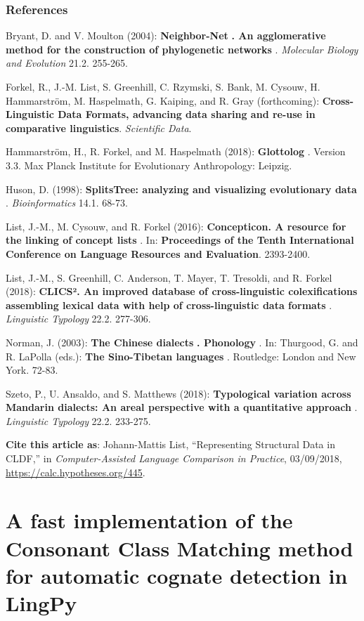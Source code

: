 \documentclass[
  english,
  a4paper,
  oneside,tablecaptionabove
]{scrbook}
\begin{document}
\hypertarget{references}{\subsection*{References}\label{references}}

Bryant, D. and V. Moulton (2004): \textbf{Neighbor-Net} \textbf{. An
agglomerative method for the construction of phylogenetic networks} .
\emph{Molecular Biology and Evolution} 21.2. 255-265.

Forkel, R., J.-M. List, S. Greenhill, C. Rzymski, S. Bank, M.
Cysouw, H. Hammarström, M. Haspelmath, G. Kaiping, and R. Gray
(forthcoming): \textbf{Cross-Linguistic Data Formats, advancing data
sharing and re-use in comparative linguistics}. \emph{Scientific Data}.

Hammarström, H., R. Forkel, and M. Haspelmath (2018):
\textbf{Glottolog} . Version 3.3. Max Planck Institute for Evolutionary
Anthropology: Leipzig.

Huson, D. (1998): \textbf{SplitsTree: analyzing and visualizing
evolutionary data} . \emph{Bioinformatics} 14.1. 68-73.

List, J.-M., M. Cysouw, and R. Forkel (2016): \textbf{Concepticon. A
resource for the linking of concept lists} . In: \textbf{Proceedings of
the Tenth International Conference on Language Resources and Evaluation}. 2393-2400.

List, J.-M., S. Greenhill, C. Anderson, T. Mayer, T. Tresoldi, and
R. Forkel (2018): \textbf{CLICS². An improved database of
cross-linguistic colexifications assembling lexical data with help of
cross-linguistic data formats} . \emph{Linguistic Typology} 22.2.
277-306.

Norman, J. (2003): \textbf{The Chinese dialects} \textbf{.
Phonology} . In: Thurgood, G. and R. LaPolla (eds.): \textbf{The
Sino-Tibetan languages} . Routledge: London and New York. 72-83.

Szeto, P., U. Ansaldo, and S. Matthews (2018): \textbf{Typological
variation across Mandarin dialects: An areal perspective with a
quantitative approach} . \emph{Linguistic Typology} 22.2. 233-275.

\textbf{Cite this article as}: Johann-Mattis List, ``Representing
Structural Data in CLDF,'' in \emph{Computer-Assisted Language Comparison
in Practice}, 03/09/2018, \url{https://calc.hypotheses.org/445}.

\hypertarget{a-fast-implementation-of-the-consonant-class-matching-method-for-automatic-cognate-detection-in-lingpy}{%
\chapter{A fast implementation of the Consonant Class Matching method
for automatic cognate detection in
LingPy}\label{a-fast-implementation-of-the-consonant-class-matching-method-for-automatic-cognate-detection-in-lingpy}}
\end{document}
